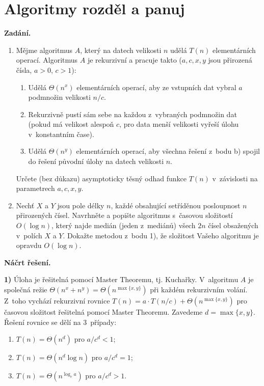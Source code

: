 \section{Algoritmy rozděl a panuj}

\noindent\textbf{Zadání.}\par
\begin{enumerate}
\item Mějme algoritmus $A$, který na datech velikosti $n$ udělá $T(n)$ elementárních
  operací. Algoritmus $A$ je rekurzivní a pracuje takto ($a, c, x, y$ jsou přirozená
  čísla, $a > 0$, $c > 1$):
  \begin{enumerate}
  \item Udělá $\Theta(n^x)$ elementárních operací, aby ze vstupních dat vybral $a$
    podmnožin velikosti $n/c$.
  \item Rekurzivně pustí sám sebe na každou z~vybraných podmnožin dat (pokud má velikost
    alespoň $c$, pro data menší velikosti vyřeší úlohu v~konstantním čase).
  \item Udělá $\Theta(n^y)$ elementárních operací, aby všechna řešení z~bodu b) spojil do
    řešení původní úlohy na datech velikosti $n$.
  \end{enumerate}
  Určete (bez důkazu) asymptoticky těsný odhad funkce $T(n)$ v~závislosti na parametrech
  $a, c, x, y$.

\item Nechť $X$ a $Y$ jsou pole délky $n$, každé obsahující setříděnou posloupnost $n$
  přirozených čísel. Navrhněte a popište algoritmus s~časovou složitostí $O(\log n)$,
  který najde medián (jeden z~mediánů) všech $2n$ čísel obsažených v~polích $X$ a $Y$.
  Dokažte metodou z~bodu 1), že složitost Vašeho algoritmu je opravdu $O(\log n)$.
\end{enumerate}

\medskip
\noindent\textbf{Náčrt řešení.}\par
\textbf{1)} Úloha je řešitelná pomocí Master Theoremu, tj. Kuchařky. V~algoritmu $A$ je
společná režie $\Theta(n^x + n^y) = \Theta(n^{\max\{x,y\}})$ při každém rekurzivním
volání. Z~toho vychází rekurzivní rovnice $T(n) = a \cdot T(n/c) + \Theta(n^{\max\{x,y\}})$
pro časovou složitost řešitelná pomocí Master Theoremu. Zavedeme $d = \max\{x, y\}$.
Řešení rovnice se dělí na 3~případy:
\begin{enumerate}
\item $T(n) = \Theta(n^d)$ pro $a/c^d < 1$;
\item $T(n) = \Theta(n^d \log n)$ pro $a/c^d = 1$;
\item $T(n) = \Theta(n^{\log_c a})$ pro $a/c^d > 1$.
\end{enumerate}

